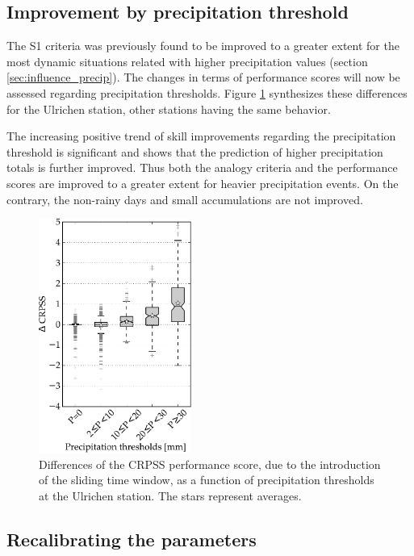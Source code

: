 \documentclass[hess]{copernicus}
\begin{document}
\subsection{Improvement by precipitation threshold}
\label{sec:improvement_CRPSS_precip_threshold}

The S1 criteria was previously found to be improved to a greater extent for the most dynamic situations related with higher precipitation values (section \ref{sec:influence_precip}). The changes in terms of performance scores will now be assessed regarding precipitation thresholds. Figure \ref{fig:changes_CRPS_precip_threshold} synthesizes these differences for the Ulrichen station, other stations having the same behavior.

The increasing positive trend of skill improvements regarding the precipitation threshold is significant and shows that the prediction of higher precipitation totals is further improved. Thus both the analogy criteria and the performance scores are improved to a greater extent for heavier precipitation events. On the contrary, the non-rainy days and small accumulations are not improved.

\begin{figure}[htb]
	\includegraphics[width=5cm]{figures/changes_CRPS_precip_threshold.pdf}
	\caption{Differences of the CRPSS performance score, due to the introduction of the sliding time window, as a function of precipitation thresholds at the Ulrichen station. The stars represent averages.}
	\label{fig:changes_CRPS_precip_threshold}
\end{figure}


\subsection{Recalibrating the parameters}
\label{sec:recalibration}
\end{document}
